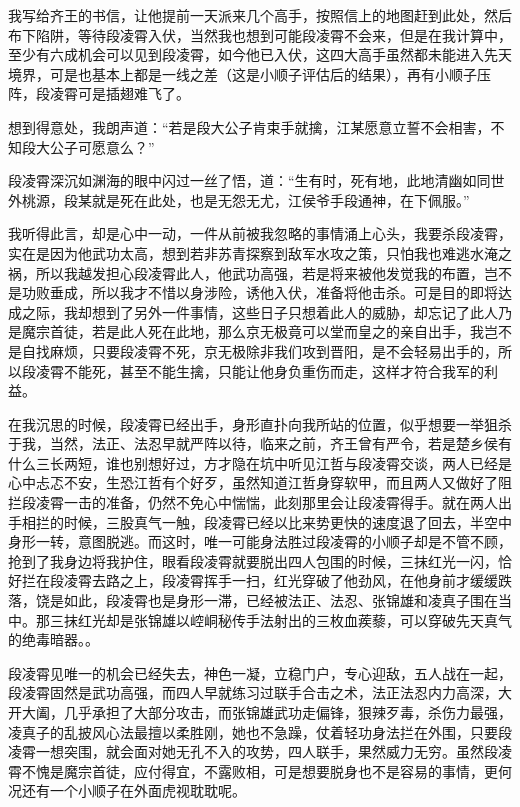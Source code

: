 我写给齐王的书信，让他提前一天派来几个高手，按照信上的地图赶到此处，然后布下陷阱，等待段凌霄入伏，当然我也想到可能段凌霄不会来，但是在我计算中，至少有六成机会可以见到段凌霄，如今他已入伏，这四大高手虽然都未能进入先天境界，可是也基本上都是一线之差（这是小顺子评估后的结果），再有小顺子压阵，段凌霄可是插翅难飞了。

想到得意处，我朗声道：“若是段大公子肯束手就擒，江某愿意立誓不会相害，不知段大公子可愿意么？”

段凌霄深沉如渊海的眼中闪过一丝了悟，道：“生有时，死有地，此地清幽如同世外桃源，段某就是死在此处，也是无怨无尤，江侯爷手段通神，在下佩服。”

我听得此言，却是心中一动，一件从前被我忽略的事情涌上心头，我要杀段凌霄，实在是因为他武功太高，想到若非苏青探察到敌军水攻之策，只怕我也难逃水淹之祸，所以我越发担心段凌霄此人，他武功高强，若是将来被他发觉我的布置，岂不是功败垂成，所以我才不惜以身涉险，诱他入伏，准备将他击杀。可是目的即将达成之际，我却想到了另外一件事情，这些日子只想着此人的威胁，却忘记了此人乃是魔宗首徒，若是此人死在此地，那么京无极竟可以堂而皇之的亲自出手，我岂不是自找麻烦，只要段凌霄不死，京无极除非我们攻到晋阳，是不会轻易出手的，所以段凌霄不能死，甚至不能生擒，只能让他身负重伤而走，这样才符合我军的利益。

在我沉思的时候，段凌霄已经出手，身形直扑向我所站的位置，似乎想要一举狙杀于我，当然，法正、法忍早就严阵以待，临来之前，齐王曾有严令，若是楚乡侯有什么三长两短，谁也别想好过，方才隐在坑中听见江哲与段凌霄交谈，两人已经是心中忐忑不安，生恐江哲有个好歹，虽然知道江哲身穿软甲，而且两人又做好了阻拦段凌霄一击的准备，仍然不免心中惴惴，此刻那里会让段凌霄得手。就在两人出手相拦的时候，三股真气一触，段凌霄已经以比来势更快的速度退了回去，半空中身形一转，意图脱逃。而这时，唯一可能身法胜过段凌霄的小顺子却是不管不顾，抢到了我身边将我护住，眼看段凌霄就要脱出四人包围的时候，三抹红光一闪，恰好拦在段凌霄去路之上，段凌霄挥手一扫，红光穿破了他劲风，在他身前才缓缓跌落，饶是如此，段凌霄也是身形一滞，已经被法正、法忍、张锦雄和凌真子围在当中。那三抹红光却是张锦雄以崆峒秘传手法射出的三枚血蒺藜，可以穿破先天真气的绝毒暗器。。

段凌霄见唯一的机会已经失去，神色一凝，立稳门户，专心迎敌，五人战在一起，段凌霄固然是武功高强，而四人早就练习过联手合击之术，法正法忍内力高深，大开大阖，几乎承担了大部分攻击，而张锦雄武功走偏锋，狠辣歹毒，杀伤力最强，凌真子的乱披风心法最擅以柔胜刚，她也不急躁，仗着轻功身法拦在外围，只要段凌霄一想突围，就会面对她无孔不入的攻势，四人联手，果然威力无穷。虽然段凌霄不愧是魔宗首徒，应付得宜，不露败相，可是想要脱身也不是容易的事情，更何况还有一个小顺子在外面虎视耽耽呢。

